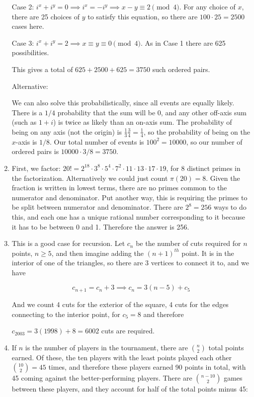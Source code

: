 \documentclass{book}
\numberwithin{equation}{section}
\begin{document}
\begin{enumerate}[label={9.\arabic*}]
Case 2: $i^x + i^y = 0 \implies i^x = -i^y \implies x - y \equiv 2 \pmod{4}$. For any choice of $x$, there are 25 choices of $y$
to satisfy this equation, so there are $100\cdot25 = 2500$ cases here.

Case 3: $i^x + i^y = 2 \implies x \equiv y \equiv 0 \pmod{4}$. As in Case 1 there are 625 possibilities.

This gives a total of $625 + 2500 + 625 = 3750$ such ordered pairs.

Alternative:

We can also solve this probabilistically, since all events are equally likely. There is a $1/4$ probability that the sum
will be 0, and any other off-axis sum (such as $1 + i$) is twice as likely than an on-axis sum. The probability of being on any
axis (not the origin) is $\frac{1}{3}\frac{3}{4} = \frac{1}{4}$, so the probability of being on the $x$-axis is $1/8$. Our
total number of events is $100^2 = 10000$, so our number of ordered pairs is $10000\cdot 3/8 = 3750$.

\item
First, we factor: $20! = 2^{18}\cdot3^8\cdot5^4\cdot7^2\cdot11\cdot13\cdot17\cdot19$, for 8 distinct primes in the
factorization. Alternatively we could just count $\pi(20) = 8$. Given the fraction is written in lowest terms, there are
no primes common to the numerator and denominator. Put another way, this is requiring the primes to be split between
numerator and denominator. There are $2^8 = 256$ ways to do this, and each one has a unique rational number
corresponding to it because it has to be between 0 and 1. Therefore the answer is 256.

\item
This is a good case for recursion. Let $c_n$ be the number of cuts required for $n$ points, $n \geq 5$, and then imagine
adding the $(n+1)^{th}$ point. It is in the interior of one of the triangles, so there are 3 vertices to connect it to, and we
have

$$c_{n+1} = c_n + 3 \implies c_n = 3(n-5) + c_5$$

And we count 4 cuts for the exterior of the square, 4 cuts for the edges connecting to the interior point, for $c_5 = 8$
and therefore

$c_{2003} = 3(1998) + 8 = 6002$ cuts are required.

\item
If $n$ is the number of players in the tournament, there are ${n \choose 2}$ total points earned. Of these, the ten
players with the least points played each other ${10 \choose 2} = 45$ times, and therefore these players earned
90 points in total, with 45 coming against the better-performing players. There are ${n-10 \choose 2}$ games between
these players, and they account for half of the total points minus 45:


\end{enumerate}
\end{document}
